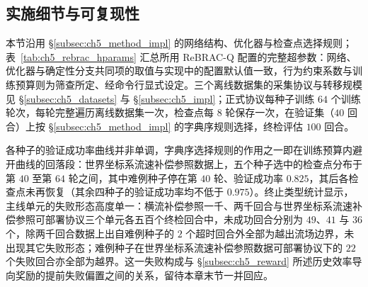 \subsection{实施细节与可复现性}\label{subsec:ch5_rebrac_impl}

本节沿用 \S\ref{subsec:ch5_method_impl} 的网络结构、优化器与检查点选择规则；表~\ref{tab:ch5_rebrac_hparams} 汇总所用 ReBRAC-Q 配置的完整超参数：网络、优化器与确定性分支共同项的取值与实现中的配置默认值一致，行为约束系数与训练预算则为筛查所定、经命令行显式设定。三个离线数据集的采集协议与转移规模见 \S\ref{subsec:ch5_datasets} 与 \S\ref{subsec:ch5_impl}；正式协议每种子训练 $64$ 个训练轮次，每轮完整遍历离线数据集一次，检查点每 $8$ 轮保存一次，在验证集（$40$ 回合）上按 \S\ref{subsec:ch5_method_impl} 的字典序规则选择，终检评估 $100$ 回合。

各种子的验证成功率曲线并非单调，字典序选择规则的作用之一即在训练预算内避开曲线的回落段：世界坐标系流速补偿参照数据上，五个种子选中的检查点分布于第 $40$ 至第 $64$ 轮之间，其中难例种子停在第 $40$ 轮、验证成功率 $0.825$，其后各检查点未再恢复（其余四种子的验证成功率均不低于 $0.975$）。终止类型统计显示，主线单元的失败形态高度单一：横流补偿参照一千、两千回合与世界坐标系流速补偿参照可部署协议三个单元各五百个终检回合中，未成功回合分别为 $49$、$41$ 与 $36$ 个，除两千回合数据上出自难例种子的 $2$ 个超时回合外全部为越出流场边界，未出现其它失败形态；难例种子在世界坐标系流速补偿参照数据可部署协议下的 $22$ 个失败回合亦全部为越界。这一失败构成与 \S\ref{subsec:ch5_reward} 所述历史效率导向奖励的提前失败偏置之间的关系，留待本章末节一并回应。

